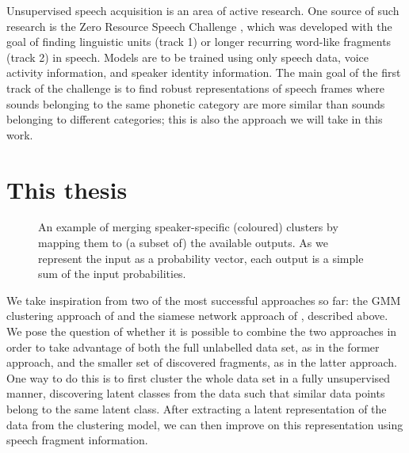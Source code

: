 Unsupervised speech acquisition is an area of active research.
One source of such research is the Zero Resource Speech Challenge \parencite{versteegh2015zero}, which was developed with the goal of finding linguistic units (track 1) or longer recurring word-like fragments (track 2) in speech.
Models are to be trained using only speech data, voice activity information, and speaker identity information.
The main goal of the first track of the challenge is to find robust representations of speech frames where sounds belonging to the same phonetic category are more similar than sounds belonging to different categories; this is also the approach we will take in this work.



\section{This thesis}

\begin{figure}
  \centering

  \caption{\label{fig:mapping}An example of merging speaker-specific (coloured) clusters by mapping them to (a subset of) the available outputs.
  As we represent the input as a probability vector, each output is a simple sum of the input probabilities.}
\end{figure}

We take inspiration from two of the most successful approaches so far: the GMM clustering approach of \textcite{chen2015parallel} and the siamese network approach of \textcite{thiolliere2015hybrid}, described above.
We pose the question of whether it is possible to combine the two approaches in order to take advantage of both the full unlabelled data set, as in the former approach, and the smaller set of discovered fragments, as in the latter approach.
One way to do this is to first cluster the whole data set in a fully unsupervised manner, discovering latent classes from the data such that similar data points belong to the same latent class.
After extracting a latent representation of the data from the clustering model, we can then improve on this representation using speech fragment information.

